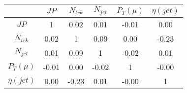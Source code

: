 \begin{tabular}{|c|c|c|c|c|c|} 
\hline
 & $JP$ & $N_{trk}$ & $N_{jet}$ & $P_{T} (\mu)$ & $\eta (jet)$ \\ \hline
$JP$ & 1 & 0.02 & 0.01 & -0.01 & 0.00 \\
$N_{trk}$ & 0.02 & 1 & 0.09 & 0.00 & -0.23 \\
$N_{jet}$ & 0.01 & 0.09 & 1 & -0.02 & 0.01 \\
$P_{T} (\mu)$ & -0.01 & 0.00 & -0.02 & 1 & -0.00 \\
$\eta (jet)$ & 0.00 & -0.23 & 0.01 & -0.00 & 1 \\
\hline 
\end{tabular} 


